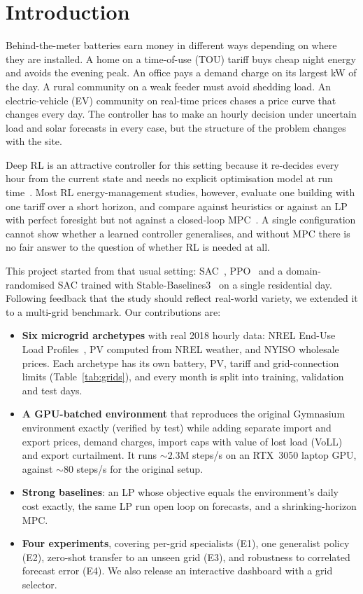\documentclass[conference]{IEEEtran}
\begin{document}
\section{Introduction}

Behind-the-meter batteries earn money in different ways depending on where they
are installed. A home on a time-of-use (TOU) tariff buys cheap night energy and
avoids the evening peak. An office pays a demand charge on its largest kW of
the day. A rural community on a weak feeder must avoid shedding load. An
electric-vehicle (EV) community on real-time prices chases a price curve that
changes every day. The controller has to make an hourly decision under uncertain
load and solar forecasts in every case, but the structure of the problem changes
with the site.

Deep RL is an attractive controller for this setting because it re-decides every
hour from the current state and needs no explicit optimisation model at run
time~\cite{vazquez2019review}. Most RL energy-management studies, however,
evaluate one building with one tariff over a short horizon, and compare against
heuristics or against an LP with perfect foresight but not against a closed-loop
MPC~\cite{parisio2014mpc}. A single configuration cannot show whether a learned
controller generalises, and without MPC there is no fair answer to the question
of whether RL is needed at all.

This project started from that usual setting: SAC~\cite{haarnoja2018sac}, PPO~\cite{schulman2017ppo}
and a domain-randomised SAC trained with Stable-Baselines3~\cite{raffin2021sb3} on a single residential
day. Following feedback that the study should reflect real-world variety, we
extended it to a multi-grid benchmark. Our contributions are:
\begin{itemize}
\item \textbf{Six microgrid archetypes} with real 2018 hourly data: NREL
End-Use Load Profiles~\cite{wilson2022eulp}, PV computed from NREL weather, and
NYISO wholesale prices. Each archetype has its own battery, PV, tariff and grid-connection
limits (Table~\ref{tab:grids}), and every month is split into
training, validation and test days.
\item \textbf{A GPU-batched environment} that reproduces the original Gymnasium
environment exactly (verified by test) while adding separate import and export prices,
demand charges, import caps with value of lost load (VoLL) and export curtailment.
It runs ${\sim}2.3$M steps/s on an RTX~3050 laptop GPU, against
${\sim}80$ steps/s for the original setup.
\item \textbf{Strong baselines}: an LP whose objective equals the environment's
daily cost exactly, the same LP run open loop on forecasts, and a
shrinking-horizon MPC.
\item \textbf{Four experiments}, covering per-grid specialists (E1), one generalist
policy (E2), zero-shot transfer to an unseen grid (E3), and robustness to
correlated forecast error (E4). We also release an interactive dashboard with a
grid selector.
\end{itemize}
\end{document}
